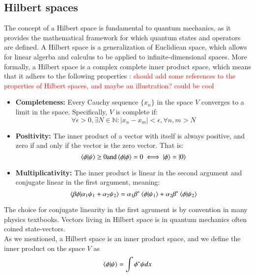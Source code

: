\documentclass{subfiles}
\begin{document}
\subsection{Hilbert spaces}\label{sec:Hilbert_space}
The concept of a Hilbert space is fundamental to quantum mechanics, as it provides the mathematical framework for which quantum states and operators are defined. A Hilbert space is a generalization of Euclidiean space, which allows for linear algerba and calculus to be applied to infinite-dimensional spaces. More formally, a Hilbert space is a complex complete inner product space, which means that it adhers to the following properties \cite{griffiths2018introduction}: \textcolor{red}{should add some references to the properties of Hilbert spaces, and maybe an illustration? could be cool}
\begin{itemize}
    \item \textbf{Completeness:} Every Cauchy sequence $\{x_n\}$ in the space $V$ converges to a limit in the space. Specifically, $V$ is complete if:
    \begin{equation}
        \forall \epsilon > 0, \exists N \in \mathbb{N} : |x_n - x_m| < \epsilon, \forall n,m > N
    \end{equation}
    \item \textbf{Positivity:} The inner product of a vector with itself is always positive, and zero if and only if the vector is the zero vector. That is:
    \begin{equation}
        \braket{\phi|\psi}\geq 0 \text{and} \braket{\phi|\phi} = 0 \iff \ket{\phi} = \ket{0} 
    \end{equation}
    \item \textbf{Multiplicativity:} The inner product is linear in the second argument and conjugate linear in the first argument, meaning:
    \begin{equation}
        \braket{\beta\phi|\alpha_1\psi_1 + \alpha_2\psi_2} = \alpha_1\beta^*\braket{\phi|\psi_1} + \alpha_2\beta^*\braket{\phi|\psi_2} 
    \end{equation}
\end{itemize}
The choice for conjugate linearity in the first agrument is by convention in many physics textbooks. Vectors living in Hilbert space is in quantum mechanics often coined state-vectors. \\ As we mentioned, a Hilbert space is an inner product space, and we define the inner product on the space $V$ as
\begin{align*}
    \braket{\phi|\psi} = \int \phi^* \psi dx
\end{align*}
\end{document}
